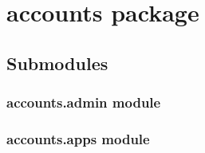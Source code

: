 \documentclass[a4paper,11pt,spanish]{sphinxmanual}
\begin{document}
\section{accounts package}
\label{\detokenize{api/accounts/accounts:accounts-package}}\label{\detokenize{api/accounts/accounts::doc}}

\subsection{Submodules}
\label{\detokenize{api/accounts/accounts:submodules}}
\sphinxstepscope


\subsubsection{accounts.admin module}
\label{\detokenize{api/accounts/accounts.admin:module-accounts.admin}}\label{\detokenize{api/accounts/accounts.admin:accounts-admin-module}}\label{\detokenize{api/accounts/accounts.admin::doc}}
\sphinxstepscope


\subsubsection{accounts.apps module}
\label{\detokenize{api/accounts/accounts.apps:module-accounts.apps}}\label{\detokenize{api/accounts/accounts.apps:accounts-apps-module}}\label{\detokenize{api/accounts/accounts.apps::doc}}
\end{document}
